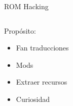 \begin{frame}{ROM Hacking}
    \begin{columns}
    \begin{column}{0.35\textwidth}
        Propósito:
        \begin{itemize}
            \item<2-> Fan traducciones
            \item<3-> Mods
            \item<4-> Extraer recursos
            \item<5-> Curiosidad
        \end{itemize}
    \end{column}
    \begin{column}{0.65\textwidth}
        \centering
    \end{column}
    \end{columns}
\end{frame}

